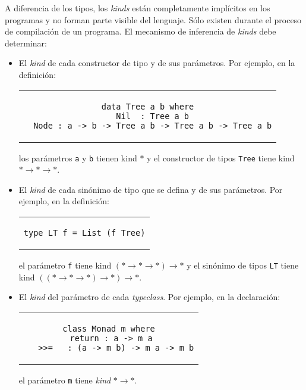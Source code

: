 A diferencia de los tipos,
los {\em kinds} están completamente implícitos en los programas y no forman parte visible del lenguaje.
Sólo existen durante el proceso de compilación de un programa.
El mecanismo de inferencia de {\em kinds} debe determinar:
\begin{itemize}
\item
  El {\em kind} de cada constructor de tipo y de sus parámetros.
  Por ejemplo, en la definición:
  \begin{center}
  \begin{tabular}{c}
  \begin{lstlisting}[mathescape=true]
data Tree a b where
  Nil  : Tree a b
  Node : a -> b -> Tree a b -> Tree a b -> Tree a b
  \end{lstlisting}
  \end{tabular}
  \end{center}
  los parámetros \verb|a| y \verb|b| tienen kind $\mathtt{*}$
  y el constructor de tipos \verb|Tree| tiene kind $\mathtt{*} \rightarrow \mathtt{*} \rightarrow \mathtt{*}$.
\item
  El {\em kind} de cada sinónimo de tipo que se defina
  y de sus parámetros.
  Por ejemplo, en la definición:
  \begin{center}
  \begin{tabular}{c}
  \begin{lstlisting}[mathescape=true]
type LT f = List (f Tree)
  \end{lstlisting}
  \end{tabular}
  \end{center}
  el parámetro \verb|f| tiene kind $(\mathtt{*} \rightarrow \mathtt{*} \rightarrow \mathtt{*}) \rightarrow \mathtt{*}$
  y
  el sinónimo de tipos \verb|LT| tiene kind $((\mathtt{*} \rightarrow \mathtt{*} \rightarrow \mathtt{*}) \rightarrow \mathtt{*}) \rightarrow \mathtt{*}$.
\item El {\em kind} del parámetro de cada {\em typeclass}.
  Por ejemplo, en la declaración:
  \begin{center}
  \begin{tabular}{c}
  \begin{lstlisting}[mathescape=true]
class Monad m where
  return : a -> m a 
  _>>=_  : (a -> m b) -> m a -> m b
  \end{lstlisting}
  \end{tabular}
  \end{center}
  el parámetro \verb|m| tiene {\em kind} $\mathtt{*} \rightarrow \mathtt{*}$.
\end{itemize}

